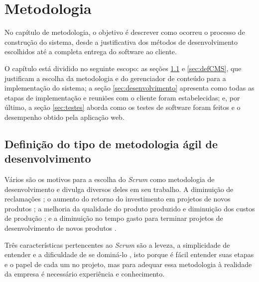 \chapter{Metodologia}
\label{ch:metodologia}

\hspace{2.5cm}

No capítulo de metodologia, o objetivo é descrever como ocorreu o processo de construção do sistema, desde a justificativa dos métodos de desenvolvimento escolhidos até a completa entrega do software ao cliente. 

O capítulo está dividido no seguinte escopo: as seções \ref{sec:defMetodologia} e \ref{sec:defCMS}, que justificam a escolha da metodologia e do gerenciador de conteúdo para a implementação do sistema; a seção \ref{sec:desenvolvimento} apresenta como todas as etapas de implementação e reuniões com o cliente foram estabelecidas; e, por último, a seção \ref{sec:testes} aborda como os testes de software foram feitos e o desempenho obtido pela aplicação web.

\hspace{2.5cm}

\section{Definição do tipo de metodologia ágil de desenvolvimento}
\label{sec:defMetodologia}

\hspace{2.5cm}

Vários são os motivos para a escolha do \textit{Scrum} como metodologia de desenvolvimento e  divulga diversos deles em seu trabalho. A diminuição de reclamações ; o aumento do retorno do investimento em projetos de novos produtos ; a melhoria da qualidade do produto produzido e diminuição dos custos de produção ; e a diminuição no tempo gasto para terminar projetos de desenvolvimento de novos produtos .

Três características pertencentes ao \textit{Scrum} são a leveza, a simplicidade de entender e a dificuldade de se dominá-lo , isto porque é fácil entender suas etapas e o papel de cada um no projeto, mas para adequar essa metodologia à realidade da empresa é necessário experiência e conhecimento.

